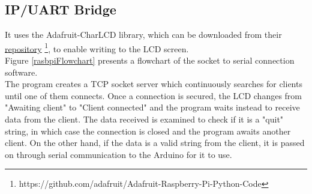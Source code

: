 
\subsection{IP/UART Bridge} 

It uses the Adafruit-CharLCD library, which can be downloaded from their \href{https://github.com/adafruit/Adafruit-Raspberry-Pi-Python-Code}{repository} \footnote{https://github.com/adafruit/Adafruit-Raspberry-Pi-Python-Code}, to enable writing to the LCD screen.\\

Figure \ref{rasbpiFlowchart} presents a flowchart of the socket to serial connection software.\\

The program creates a TCP socket server which continuously searches for clients until one of them connects. Once a connection is secured, the LCD changes from "Awaiting client" to "Client connected" and the program waits instead to receive data from the client. The data received is examined to check if it is a "quit" string, in which case the connection is closed and the program awaits another client. On the other hand, if the data is a valid string from the client, it is passed on through serial communication to the Arduino for it to use.

%

